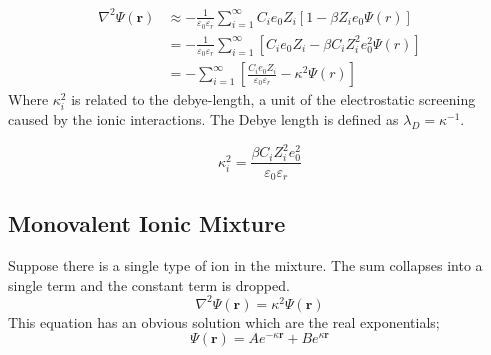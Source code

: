 \begin{align*}
    \nabla^2 \Psi(\mathbf{r}) &\approx -\frac{1}{\varepsilon_0 \varepsilon_r}\sum_{i =1}^\infty C_i e_0 Z_i \left[1-\beta Z_i e_0\Psi(r)\right] \\
    &= -\frac{1}{\varepsilon_0 \varepsilon_r}\sum_{i =1}^\infty \left[C_i e_0 Z_i-\beta C_i Z_i^2 e_0^2\Psi(r)\right]\\
    &= -\sum_{i =1}^\infty \left[\frac{C_i e_0 Z_i}{\varepsilon_0 \varepsilon_r}-\kappa^2 \Psi(r)\right]
\end{align*}
Where $\kappa_i^2$ is related to the debye-length, a unit of the electrostatic screening caused by the ionic interactions. The Debye length is defined as $\lambda_D = \kappa^{-1}$.

\begin{equation}
 \kappa_i^2 = \frac{\beta C_i Z_i^2 e_0^2}{\varepsilon_0 \varepsilon_r}
\end{equation}

\subsection{Monovalent Ionic Mixture}
Suppose there is a single type of ion in the mixture. The sum collapses into a single term and the constant term is dropped.
\begin{equation}
    \nabla^2 \Psi(\mathbf{r}) = \kappa^2 \Psi(\mathbf{r})
\end{equation}
This equation has an obvious solution which are the real exponentials;
\begin{equation}
    \Psi(\mathbf{r}) = A e^{-\kappa\mathbf{r}} + B e^{\kappa\mathbf{r}}
\end{equation}
